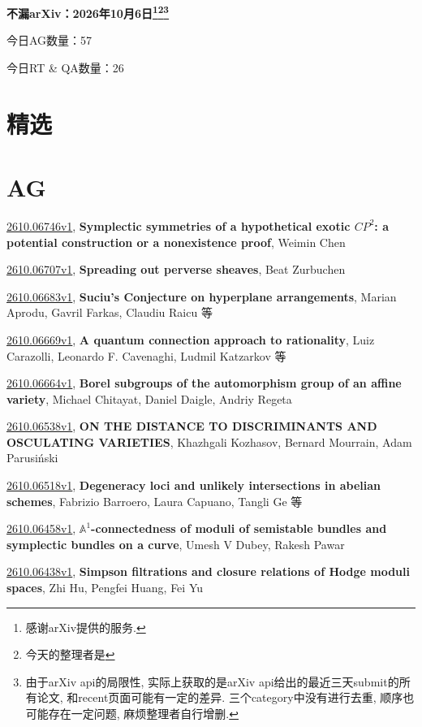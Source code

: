 \documentclass[9pt, a4paper]{article}
\theoremstyle{plain}
\theoremstyle{definition}
\theoremstyle{remark}
\newcommand{\arxiv}[3]{\href{https://arxiv.org/abs/#1}{#1}, \textbf{\textcolor{arxivblue}{#2}}, #3}
\newcommand{\AGnumber}{57}
\newcommand{\RTQAnumber}{26}
\newcommand{\NewestDate}{2026年10月6日}
\newcommand{\todayarXiver}{} %
\begin{document}
\begin{center}
    \Huge\textbf{不漏arXiv：\NewestDate\footnote{感谢arXiv提供的服务.}\footnote{今天的整理者是\todayarXiver}\footnote{由于arXiv api的局限性, 实际上获取的是arXiv api给出的最近三天submit的所有论文, 和recent页面可能有一定的差异. 三个category中没有进行去重, 顺序也可能存在一定问题, 麻烦整理者自行增删.}} \\
\end{center}

\setcounter{section}{-1}

\begin{center}
    今日AG数量：\AGnumber
    
    今日RT \& QA数量：\RTQAnumber
    
\end{center}


\section{精选}


\section{AG}
\arxiv{2610.06746v1}{Symplectic symmetries of a hypothetical exotic $CP^2$: a potential construction or a nonexistence proof}{Weimin Chen}

\arxiv{2610.06707v1}{Spreading out perverse sheaves}{Beat Zurbuchen}

\arxiv{2610.06683v1}{Suciu's Conjecture on hyperplane arrangements}{Marian Aprodu, Gavril Farkas, Claudiu Raicu 等}

\arxiv{2610.06669v1}{A quantum connection approach to rationality}{Luiz Carazolli, Leonardo F. Cavenaghi, Ludmil Katzarkov 等}

\arxiv{2610.06664v1}{Borel subgroups of the automorphism group of an affine variety}{Michael Chitayat, Daniel Daigle, Andriy Regeta}

\arxiv{2610.06538v1}{ON THE DISTANCE TO DISCRIMINANTS AND OSCULATING VARIETIES}{Khazhgali Kozhasov, Bernard Mourrain, Adam Parusi{ń}ski}

\arxiv{2610.06518v1}{Degeneracy loci and unlikely intersections in abelian schemes}{Fabrizio Barroero, Laura Capuano, Tangli Ge 等}

\arxiv{2610.06458v1}{$\mathbb{A}^1$-connectedness of moduli of semistable bundles and symplectic bundles on a curve}{Umesh V Dubey, Rakesh Pawar}

\arxiv{2610.06438v1}{Simpson filtrations and closure relations of Hodge moduli spaces}{Zhi Hu, Pengfei Huang, Fei Yu}
\end{document}
